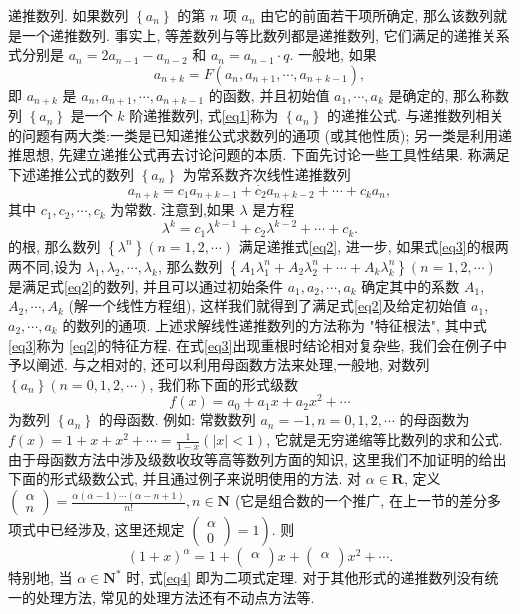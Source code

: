 
递推数列.
如果数列 $\left\{a_n\right\}$ 的第 $n$ 项 $a_n$ 由它的前面若干项所确定, 那么该数列就是一个递推数列.
事实上, 等差数列与等比数列都是递推数列, 它们满足的递推关系式分别是 $a_n=2 a_{n-1}-a_{n-2}$ 和 $a_n=a_{n-1} \cdot q$.
一般地, 如果
$$
a_{n+k}=F\left(a_n, a_{n+1}, \cdots, a_{n+k-1}\right), \label{eq1}
$$
即 $a_{n+k}$ 是 $a_n, a_{n+1}, \cdots, a_{n+k-1}$ 的函数, 并且初始值 $a_1, \cdots, a_k$ 是确定的, 那么称数列 $\left\{a_n\right\}$ 是一个 $k$ 阶递推数列, 式\ref{eq1}称为 $\left\{a_n\right\}$ 的递推公式.
与递推数列相关的问题有两大类:一类是已知递推公式求数列的通项 (或其他性质); 另一类是利用递推思想, 先建立递推公式再去讨论问题的本质.
下面先讨论一些工具性结果.
称满足下述递推公式的数列 $\left\{a_n\right\}$ 为常系数齐次线性递推数列
$$
a_{n+k}=c_1 a_{n+k-1}+\dot{c_2} a_{n+k-2}+\cdots+c_k a_n, \label{eq2}
$$
其中 $c_1, c_2, \cdots, c_k$ 为常数.
注意到,如果 $\lambda$ 是方程
$$
\lambda^k=c_1 \lambda^{k-1}+c_2 \lambda^{k-2}+\cdots+c_k . \label{eq3}
$$
的根, 那么数列 $\left\{\lambda^n\right\}(n=1,2, \cdots)$ 满足递推式\ref{eq2}, 进一步, 如果式\ref{eq3}的根两两不同,设为 $\lambda_1, \lambda_2, \cdots, \lambda_k$, 那么数列 $\left\{A_1 \lambda_1^n+A_2 \lambda_2^n+\cdots+A_k \lambda_k^n\right\}(n=1,2, \cdots)$ 是满足式\ref{eq2}的数列, 并且可以通过初始条件 $a_1, a_2, \cdots, a_k$ 确定其中的系数 $A_1$, $A_2, \cdots, A_k$ (解一个线性方程组), 这样我们就得到了满足式\ref{eq2}及给定初始值 $a_1$, $a_2, \cdots, a_k$ 的数列的通项.
上述求解线性递推数列的方法称为 "特征根法", 其中式\ref{eq3}称为 \ref{eq2}的特征方程.
在式\ref{eq3}出现重根时结论相对复杂些, 我们会在例子中予以阐述.
与之相对的, 还可以利用母函数方法来处理,一般地, 对数列 $\left\{a_n\right\}(n= 0,1,2, \cdots)$, 我们称下面的形式级数
$$
f(x)=a_0+a_1 x+a_2 x^2+\cdots
$$
为数列 $\left\{a_n\right\}$ 的母函数.
例如: 常数数列 $a_n=-1, n=0,1,2, \cdots$ 的母函数为 $f(x)=1+x+ x^2+\cdots=\frac{1}{1-x}(|x|<1)$, 它就是无穷递缩等比数列的求和公式.
由于母函数方法中涉及级数收玫等高等数列方面的知识, 这里我们不加证明的给出下面的形式级数公式, 并且通过例子来说明使用的方法.
对 $\alpha \in \mathbf{R}$, 定义 $\left(\begin{array}{l}\alpha \\ n\end{array}\right)=\frac{\alpha(\alpha-1) \cdots(\alpha-n+1)}{n !}, n \in \mathbf{N}$ (它是组合数的一个推广, 在上一节的差分多项式中已经涉及, 这里还规定 $\left.\left(\begin{array}{l}\alpha \\ 0\end{array}\right)=1\right)$. 则
$$
(1+x)^\alpha=1+\left(\begin{array}{l}
\alpha \\
\end{array}\right) x+\left(\begin{array}{l}
\alpha \\
\end{array}\right) x^2+\cdots . \label{eq4}
$$
特别地, 当 $\alpha \in \mathbf{N}^*$ 时, 式\ref{eq4} 即为二项式定理.
对于其他形式的递推数列没有统一的处理方法, 常见的处理方法还有不动点方法等.



